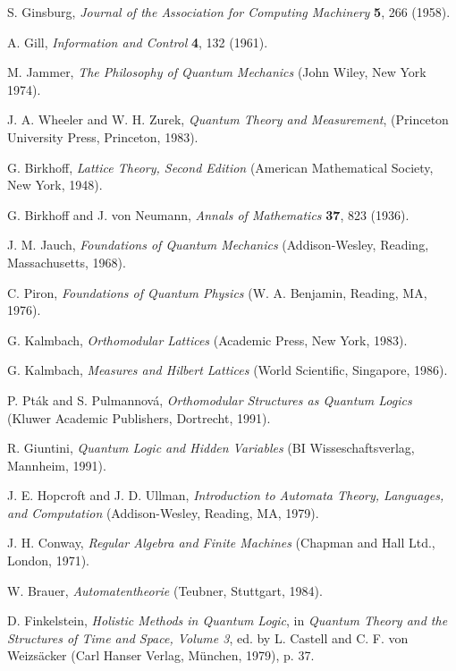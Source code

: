 \documentclass{article}
\begin{document}
\begin{thebibliography}{999}
 S. Ginsburg, {\sl Journal of the Association for Computing Machinery}
 {\bf 5}, 266 (1958).

 A. Gill, {\sl Information and Control} {\bf 4}, 132 (1961).




M. Jammer,
{\sl The Philosophy of Quantum Mechanics} (John Wiley, New York 1974).

 J. A. Wheeler and W. H. Zurek,
 {\sl Quantum Theory and Measurement},
 (Princeton University Press, Princeton, 1983).

 G. Birkhoff, {\em Lattice Theory, Second Edition} (American
 Mathematical Society, New York, 1948).

 G. Birkhoff and J. von  Neumann, {\sl Annals of Mathematics} {\bf 37},
 823 (1936).

 J. M. Jauch, {\sl Foundations of Quantum Mechanics} (Addison-Wesley,
 Reading, Massachusetts, 1968).

 C. Piron, {\sl Foundations of Quantum Physics} (W. A. Benjamin,
 Reading, MA, 1976).

 G. Kalmbach, {\sl Orthomodular Lattices} (Academic Press, New York,
 1983).

 G. Kalmbach, {\sl Measures and Hilbert Lattices} (World Scientific,
Singapore, 1986).

 P. Pt\'ak and S. Pulmannov\'a,
 {\sl Orthomodular Structures as Quantum Logics}
 (Kluwer Academic Publishers, Dortrecht, 1991).

R. Giuntini, {\sl Quantum Logic and Hidden Variables}
(BI
Wisseschaftsverlag, Mannheim, 1991).

 J. E. Hopcroft and J. D. Ullman,
 {\sl Introduction to Automata Theory, Languages, and Computation}
 (Addison-Wesley, Reading, MA, 1979).

 J. H. Conway, {\sl Regular Algebra and Finite Machines} (Chapman and
 Hall Ltd., London, 1971).

 W. Brauer, {\sl Automatentheorie} (Teubner, Stuttgart, 1984).

 D. Finkelstein,
 {\sl Holistic Methods in Quantum Logic}, in {\sl Quantum Theory and
 the Structures of Time and Space, Volume 3}, ed. by L. Castell and C.
 F. von Weizs\"acker (Carl Hanser Verlag, M\"unchen, 1979), p. 37.



\end{thebibliography}
\end{document}
